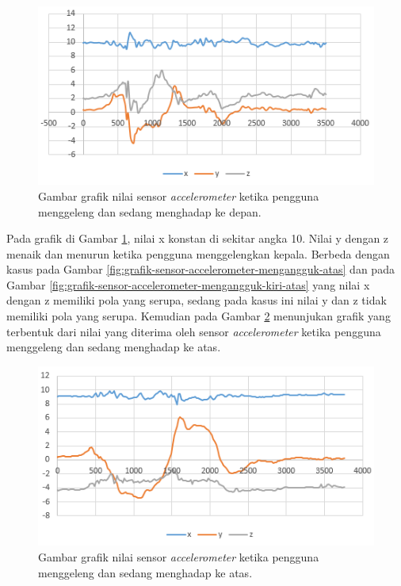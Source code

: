 \begin{figure}[htbp]
\centering
\includegraphics[scale=1]{Gambar/grafik-sensor-accelerometer-menggeleng-depan.png}
\caption{Gambar grafik nilai sensor \textit{accelerometer} ketika pengguna menggeleng dan sedang menghadap ke depan.} 
\label{fig:grafik-sensor-accelerometer-menggeleng-depan}
\end{figure}

Pada grafik di Gambar \ref{fig:grafik-sensor-accelerometer-menggeleng-depan}, nilai x konstan di sekitar angka 10. Nilai y dengan z menaik dan menurun ketika pengguna menggelengkan kepala. Berbeda dengan kasus pada Gambar \ref{fig:grafik-sensor-accelerometer-mengangguk-atas} dan pada Gambar \ref{fig:grafik-sensor-accelerometer-mengangguk-kiri-atas} yang nilai x dengan z memiliki pola yang serupa, sedang pada kasus ini nilai y dan z tidak memiliki pola yang serupa. Kemudian pada Gambar \ref{fig:grafik-sensor-accelerometer-menggeleng-atas} menunjukan grafik yang terbentuk dari nilai yang diterima oleh sensor \textit{accelerometer} ketika pengguna menggeleng dan sedang menghadap ke atas.

\begin{figure}[htbp]
\centering
\includegraphics[scale=1]{Gambar/grafik-sensor-accelerometer-menggeleng-atas.png}
\caption{Gambar grafik nilai sensor \textit{accelerometer} ketika pengguna menggeleng dan sedang menghadap ke atas.} 
\label{fig:grafik-sensor-accelerometer-menggeleng-atas}
\end{figure}

